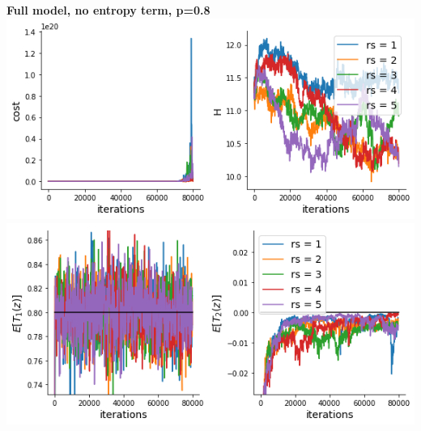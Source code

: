 \documentclass[11pt]{article}
\begin{document}
\begin{center}
\textbf{Full model, no entropy term, p=0.8} \\
\includegraphics[scale=0.6]{figs/cost_H_SC_full_c=0_p=80.png} \\
\includegraphics[scale=0.6]{figs/constraints_SC_full_c=0_p=80.png}
\end{center}
\end{document}
